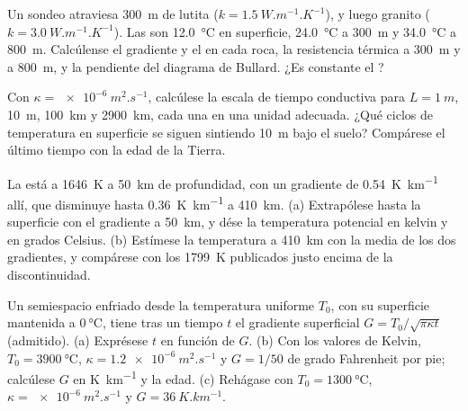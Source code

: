\begin{exercise}[$\star\star$]\label{exo:b1:heat-budget:6}
Un sondeo atraviesa \qty{300}{m} de lutita ($k = \qty{1.5}{W.m^{-1}.K^{-1}}$), y luego granito ($k = \qty{3.0}{W.m^{-1}.K^{-1}}$).
Las  son \qty{12.0}{\degreeCelsius} en superficie, \qty{24.0}{\degreeCelsius} a \qty{300}{m} y
\qty{34.0}{\degreeCelsius} a \qty{800}{m}. Calcúlense el gradiente y el  en cada roca, la resistencia térmica a
\qty{300}{m} y a \qty{800}{m}, y la pendiente del diagrama de Bullard. ¿Es constante el ?
\end{exercise}

\begin{exercise}[$\star\star$]\label{exo:b1:heat-budget:7}
Con $\kappa = \qty{e-6}{m^2.s^{-1}}$, calcúlese la escala de tiempo conductiva para $L = \qty{1}{m}$, \qty{10}{m},
\qty{100}{km} y \qty{2900}{km}, cada una en una unidad adecuada. ¿Qué ciclos de temperatura en superficie se siguen sintiendo
\qty{10}{m} bajo el suelo? Compárese el último tiempo con la edad de la Tierra.
\end{exercise}

\begin{exercise}[$\star\star$]\label{exo:b1:heat-budget:8}
La  está a \qty{1646}{K} a \qty{50}{km} de profundidad, con un gradiente de \qty{0.54}{K.km^{-1}} allí, que
disminuye hasta \qty{0.36}{K.km^{-1}} a \qty{410}{km}. (a) Extrapólese hasta la superficie con el gradiente a \qty{50}{km}, y
dése la temperatura potencial en kelvin y en grados Celsius. (b) Estímese la temperatura a \qty{410}{km} con la media de los dos
gradientes, y compárese con los \qty{1799}{K} publicados justo encima de la discontinuidad.
\end{exercise}

\begin{exercise}[$\star\star$]\label{exo:b1:heat-budget:9}
Un semiespacio enfriado desde la temperatura uniforme $T_0$, con su superficie mantenida a
$\qty{0}{\degreeCelsius}$, tiene tras un tiempo $t$ el gradiente superficial $G =
T_0/\sqrt{\pi\kappa t}$ (admitido). (a) Exprésese $t$ en función de $G$. (b) Con los valores de Kelvin,
$T_0 = \qty{3900}{\degreeCelsius}$, $\kappa =
\qty{1.2e-6}{m^2.s^{-1}}$ y $G = 1/50$ de grado Fahrenheit por pie; calcúlese $G$ en \unit{K.km^{-1}} y la edad.
(c) Rehágase con $T_0 =
\qty{1300}{\degreeCelsius}$, $\kappa = \qty{e-6}{m^2.s^{-1}}$ y $G =
\qty{36}{K.km^{-1}}$.
\end{exercise}

